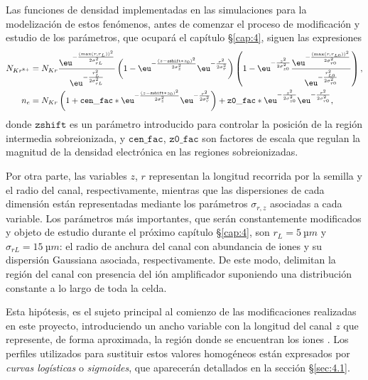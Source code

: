 Las funciones de densidad implementadas en las simulaciones para la modelización de estos fenómenos, antes de comenzar el proceso de modificación y estudio de los parámetros, que ocupará el capítulo \S\ref{cap:4}, siguen las expresiones
\begin{align}
  \label{eq:3.19a}
  N_{Kr^{8+}} &= N_{Kr}\frac{\eu^{-\frac{(\max(r,r_{L}))^{2}}{2 \sigma_{rL}^{2}}}}{\eu^{-\frac{r_{L}^{2}}{2 \sigma_{rL}^{2}}}}\left(1-\eu^{-\frac{(z-\mathtt{zshift}*z_{0})^{2}}{2 \sigma_{z}^{2}}}\eu^{-\frac{r^{2}}{2 \sigma_{r}^{2}}}\right)\left(1-\eu^{-\frac{z^{2}}{2 \sigma_{z0}^{2}}}\frac{\eu^{-\frac{(\max(r,r_{L0}))^{2}}{2 \sigma_{r0}^{2}}}}{\eu^{-\frac{r_{L0}^{2}}{2 \sigma_{r0}^{2}}}}\right), \\
  \label{eq:3.19b}
  n_{e} &= N_{Kr}\left(1+\mathtt{cen\_fac}*\eu^{-\frac{(z-\mathtt{zshift}*z_{0})^{2}}{2 \sigma_{z}^{2}}}\eu^{-\frac{r^{2}}{2 \sigma_{r}^{2}}}\right)+\mathtt{z0\_fac}*\eu^{-\frac{z^{2}}{2 \sigma_{z0}^{2}}}\eu^{-\frac{r^{2}}{2 \sigma_{r0}^{2}}},
\end{align}
donde $\mathtt{zshift}$ es un parámetro introducido para controlar la posición de la región intermedia sobreionizada, y $\mathtt{cen\_fac}$, $\mathtt{z0\_fac}$ son factores de escala que regulan la magnitud de la densidad electrónica en las regiones sobreionizadas. 

Por otra parte, las variables $z$, $r$ representan la longitud recorrida por la semilla y el radio del canal, respectivamente, mientras que las dispersiones de cada dimensión están representadas mediante los parámetros $\sigma_{r,z}$ asociadas a cada variable. Los parámetros más importantes, que serán constantemente modificados y objeto de estudio durante el próximo capítulo \S\ref{cap:4}, son $r_{L} = \qty{5}{µm}$ y $\sigma_{rL} = \qty{15}{µm}$: el radio de anchura del canal con abundancia de iones  y su dispersión Gaussiana asociada, respectivamente. De este modo, delimitan la región del canal con presencia del ión amplificador suponiendo una distribución constante a lo largo de toda la celda. 

Esta hipótesis, es el sujeto principal al comienzo de las modificaciones realizadas en este proyecto, introduciendo un ancho variable con la longitud del canal $z$ que represente, de forma aproximada, la región donde se encuentran los iones . Los perfiles utilizados para sustituir estos valores homogéneos están expresados por \emph{curvas logísticas} o \emph{sigmoides}, que aparecerán detallados en la sección \S\ref{sec:4.1}. 

